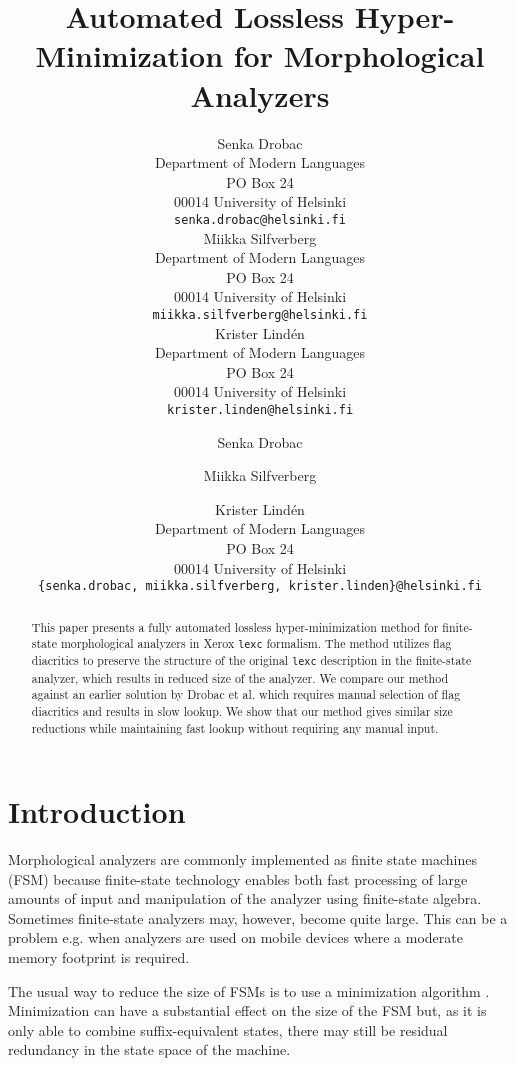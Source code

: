 \documentclass[11pt]{article}
\title{Automated Lossless Hyper-Minimization for Morphological Analyzers}
\author{Senka Drobac \\
Department of Modern Languages \\
PO Box 24 \\
00014 University of Helsinki \\
  {\tt senka.drobac@helsinki.fi} \\\And
  Miikka Silfverberg \\
  Department of Modern Languages \\
    PO Box 24 \\
    00014 University of Helsinki \\
    {\tt miikka.silfverberg@helsinki.fi} \\\And
	  Krister Lind\'{e}n \\
Department of Modern Languages \\
    PO Box 24 \\
00014 University of Helsinki\\
  {\tt krister.linden@helsinki.fi} \\}
\author{Senka Drobac  \and Miikka Silfverberg \and Krister Lind\'{e}n  \\
Department of Modern Languages \\
PO Box 24 \\
00014 University of Helsinki \\
{\tt \{senka.drobac, miikka.silfverberg, krister.linden\}@helsinki.fi} \\}
\date{}
\begin{document}
\maketitle
\begin{abstract}
  This paper presents a fully automated lossless hyper-minimization
  method for finite-state morphological analyzers in Xerox {\tt lexc}
  formalism. The method utilizes flag diacritics to preserve the
  structure of the original {\tt lexc} description in the finite-state
  analyzer, which results in reduced size of the analyzer. We compare
  our method against an earlier solution by Drobac et al.  which
  requires manual selection of flag diacritics and results in slow
  lookup. We show that our method gives similar size reductions while
  maintaining fast lookup without requiring any manual input.

\end{abstract}

\section{Introduction}

Morphological analyzers are commonly implemented as finite state
machines (FSM) because finite-state technology enables both fast
processing of large amounts of input and manipulation of the analyzer
using finite-state algebra. Sometimes finite-state analyzers may,
however, become quite large. This can be a problem e.g. when analyzers are
used on mobile devices where a moderate memory footprint is required.
 

The usual way to reduce the size of FSMs is to use a minimization
algorithm \cite{hopcroft1971n}. Minimization can have a substantial effect on the size
of the FSM but, as it is only able to combine suffix-equivalent
states, there may still be residual redundancy in the state space of the
machine.
\end{document}
